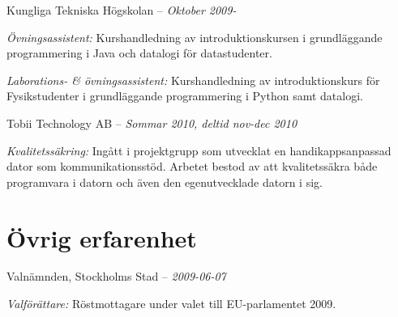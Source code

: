 \documentclass[a4paper]{article}
\renewenvironment{itemize}{
  \begin{list}{}{
    \setlength{\leftmargin}{1.5em}
  }
}{
  \end{list}
}
\begin{document}
\begin{itemize}
	\item Kungliga Tekniska Högskolan -- \emph{Oktober 2009-}
	\begin{itemize}
		\item \emph{Övningsassistent:} Kurshandledning av introduktionskursen i grundläggande programmering i Java och datalogi för datastudenter.
		\item \emph{Laborations- \& övningsassistent:} Kurshandledning av introduktionskurs för Fysikstudenter i grundläggande programmering i Python samt datalogi.
	\end{itemize}

	\item Tobii Technology AB -- \emph{Sommar 2010, deltid nov-dec 2010}
	\begin{itemize}
		\item \emph{Kvalitetssäkring:} Ingått i projektgrupp som utvecklat en handikappsanpassad dator som kommunikationsstöd. Arbetet bestod av att kvalitetssäkra både programvara i datorn och även den egenutvecklade datorn i sig.
	\end{itemize}



\end{itemize}

\section*{Övrig erfarenhet}

\begin{itemize}
	\item Valnämnden, Stockholms Stad -- \emph{2009-06-07}
	\begin{itemize}
		\item \emph{Valförättare:} Röstmottagare under valet till EU-parlamentet 2009.
	\end{itemize}
\end{itemize}
\end{document}
